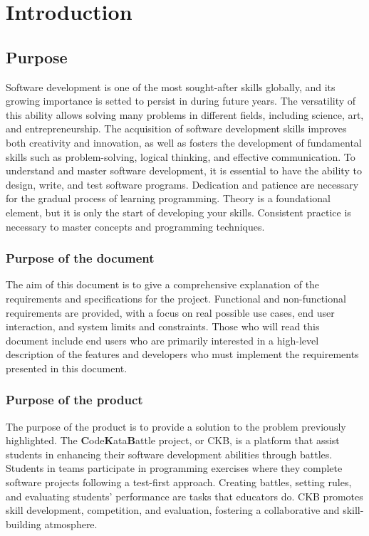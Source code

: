 \chapter{Introduction}

\section{Purpose}
Software development is one of the most sought-after skills globally, and its growing importance is setted to persist in during future years. 
The versatility of this ability allows solving many problems in different fields, including science, art, and entrepreneurship.
The acquisition of software development skills improves both creativity and innovation, as well as fosters the development of fundamental skills such as problem-solving, logical thinking, and effective communication. 
To understand and master software development, it is essential to have the ability to design, write, and test software programs.
Dedication and patience are necessary for the gradual process of learning programming.
Theory is a foundational element, but it is only the start of developing your skills. Consistent practice is necessary to master concepts and programming techniques.

\subsection{Purpose of the document}
The aim of this document is to give a comprehensive explanation of the requirements and specifications for the project.
Functional and non-functional requirements are provided, with a focus on real possible use cases, end user interaction, and system limits and constraints. 
Those who will read this document include end users who are primarily interested in a high-level description of the features 
and developers who must implement the requirements presented in this document.

\subsection{Purpose of the product}
The purpose of the product is to provide a solution to the problem previously highlighted.
The \textbf{C}ode\textbf{K}ata\textbf{B}attle project, or CKB, is a platform that assist students in enhancing their software development abilities through battles.
Students in teams participate in programming exercises where they complete software projects following a test-first approach.
Creating battles, setting rules, and evaluating students' performance are tasks that educators do.
CKB promotes skill development, competition, and evaluation, fostering a collaborative and skill-building atmosphere.

